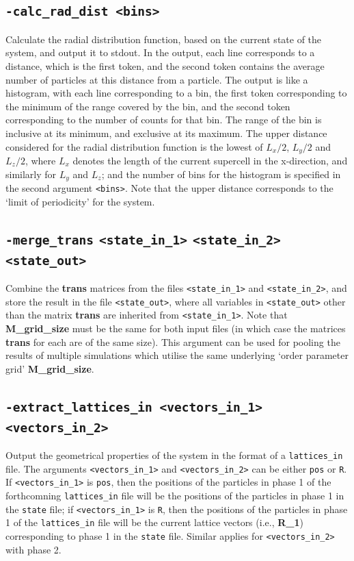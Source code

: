 \documentclass{report}
\begin{document}
\subsection{\texttt{-calc\_rad\_dist <bins>}}
Calculate the radial distribution function, based on the current state of the system, and output it to stdout. In the output, each line corresponds 
to a distance, which is the first token, and the second token contains the average number of particles at this distance from a particle. The 
output is like a histogram, with each line corresponding to a bin, the first token corresponding to the minimum of the range covered by the 
bin, and the second token corresponding to the number of counts for that bin. The range of the bin is inclusive at its minimum, and 
exclusive at its maximum. The upper distance considered for the radial distribution function is the lowest of $L_x/2$, $L_y/2$ and $L_z/2$,
where $L_x$ denotes the length of the current supercell in the x-direction, and similarly for $L_y$ and $L_z$; and the number of bins for 
the histogram is specified in the second argument \texttt{<bins>}. Note that the upper distance corresponds to the `limit of periodicity' for the system. 

\subsection{\texttt{-merge\_trans} \texttt{<state\_in\_1>}  \texttt{<state\_in\_2>} \texttt{<state\_out>}}
Combine the \textbf{trans} matrices from the files \texttt{<state\_in\_1>} and \texttt{<state\_in\_2>}, and store the result in the 
file \texttt{<state\_out>}, where all variables in \texttt{<state\_out>} other than the matrix \textbf{trans} are inherited from 
\texttt{<state\_in\_1>}. Note that \textbf{M\_grid\_size} must be the same for both input files (in which case the matrices \textbf{trans} for
each are of the same size). This argument can be used for pooling the results of multiple simulations which utilise the same underlying
`order parameter grid' \textbf{M\_grid\_size}.

\subsection{\texttt{-extract\_lattices\_in <vectors\_in\_1> <vectors\_in\_2>}}
Output the geometrical properties of the system in the format of a \texttt{lattices\_in} file. The arguments \texttt{<vectors\_in\_1>}
and \texttt{<vectors\_in\_2>} can be either \texttt{pos} or \texttt{R}. If \texttt{<vectors\_in\_1>} is \texttt{pos}, then
the positions of the particles in phase 1 of the forthcomning \texttt{lattices\_in} file will be the positions of the particles in phase 1
in the \texttt{state} file; if \texttt{<vectors\_in\_1>} is \texttt{R}, then the positions of the particles in phase 1 of the 
\texttt{lattices\_in} file will be the current lattice vectors (i.e., \textbf{R\_1}) corresponding to phase 1 in the \texttt{state} file.
Similar applies for \texttt{<vectors\_in\_2>} with phase 2.
\end{document}
